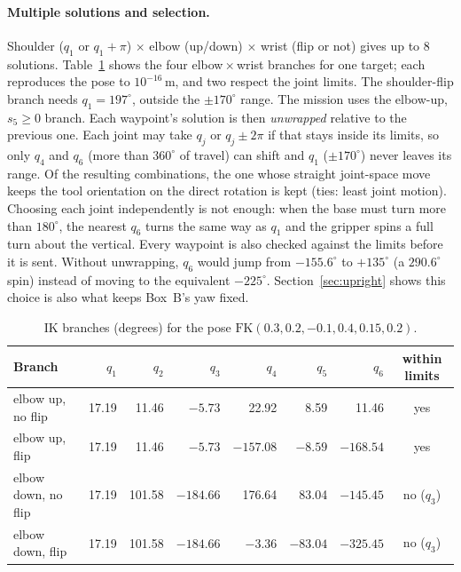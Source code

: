 \documentclass[11pt,a4paper]{article}
\begin{document}
\paragraph{Multiple solutions and selection.}
Shoulder (\(q_1\) or \(q_1+\pi\)) \(\times\) elbow (up/down) \(\times\) wrist (flip or not)
gives up to 8 solutions. Table~\ref{tab:branches} shows the four elbow\,\(\times\)\,wrist
branches for one target; each reproduces the pose to \(10^{-16}\)\,m, and two respect the
joint limits. The shoulder-flip branch needs \(q_1=197^\circ\), outside the \(\pm170^\circ\)
range. The mission uses the elbow-up, \(s_5\ge0\) branch. Each waypoint's solution is then
\emph{unwrapped} relative to the previous one. Each joint may take \(q_j\) or \(q_j\pm2\pi\) if
that stays inside its limits, so only \(q_4\) and \(q_6\) (more than \(360^\circ\) of travel) can
shift and \(q_1\) (\(\pm170^\circ\)) never leaves its range. Of the resulting combinations, the
one whose straight joint-space move keeps the tool orientation on the direct rotation is kept
(ties: least joint motion). Choosing each joint independently is not enough: when the base
must turn more than \(180^\circ\), the nearest \(q_6\) turns the same way as \(q_1\) and the
gripper spins a full turn about the vertical. Every waypoint is also checked against the limits
before it is sent. Without unwrapping,
\(q_6\) would jump from \(-155.6^\circ\) to \(+135^\circ\) (a \(290.6^\circ\) spin) instead of
moving to the equivalent \(-225^\circ\). Section~\ref{sec:upright} shows this choice is also
what keeps Box~B's yaw fixed.

\begin{table}[h]
\centering\small
\begin{tabular}{lrrrrrrc}
\toprule
Branch & \(q_1\) & \(q_2\) & \(q_3\) & \(q_4\) & \(q_5\) & \(q_6\) & within limits \\
\midrule
elbow up, no flip   & 17.19 & 11.46 & \(-5.73\) & 22.92 & 8.59 & 11.46 & yes \\
elbow up, flip      & 17.19 & 11.46 & \(-5.73\) & \(-157.08\) & \(-8.59\) & \(-168.54\) & yes \\
elbow down, no flip & 17.19 & 101.58 & \(-184.66\) & 176.64 & 83.04 & \(-145.45\) & no (\(q_3\)) \\
elbow down, flip    & 17.19 & 101.58 & \(-184.66\) & \(-3.36\) & \(-83.04\) & \(-325.45\) & no (\(q_3\)) \\
\bottomrule
\end{tabular}
\caption{IK branches (degrees) for the pose \(\mathrm{FK}(0.3, 0.2, -0.1, 0.4, 0.15, 0.2)\).}
\label{tab:branches}
\end{table}
\end{document}
